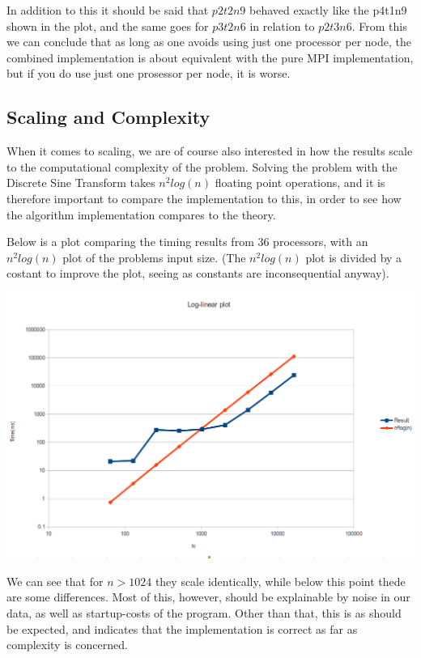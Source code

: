 \documentclass[fontsize=11pt,paper=a4,titlepage]{article}
\begin{document}
In addition to this it should be said that $p2t2n9$ behaved exactly like the p4t1n9 shown in the plot, and the same goes for $p3t2n6$ in relation to $p2t3n6$. From this we can conclude that as long as one avoids using just one processor per node, the combined implementation is about equivalent with the pure MPI implementation, but if you do use just one prosessor per node, it is worse.

\subsection{Scaling and Complexity}
When it comes to scaling, we are of course also interested in how the results scale to the computational complexity of the problem. Solving the problem with the Discrete Sine Transform takes $n^2log(n)$ floating point operations, and it is therefore important to compare the implementation to this, in order to see how the algorithm implementation compares to the theory.

Below is a plot comparing the timing results from 36 processors, with an $n^2log(n)$ plot of the problems input size. (The $n^2log(n)$ plot is divided by a costant to improve the plot, seeing as constants are inconsequential anyway).

\hspace*{-2.5cm}\includegraphics[scale=0.55]{pics/logplot.png}

We can see that for $n>1024$ they scale identically, while below this point thede are some differences. Most of this, however, should be explainable by noise in our data, as well as startup-costs of the program. Other than that, this is as should be expected, and indicates that the implementation is correct as far as complexity is concerned. 
\end{document}
